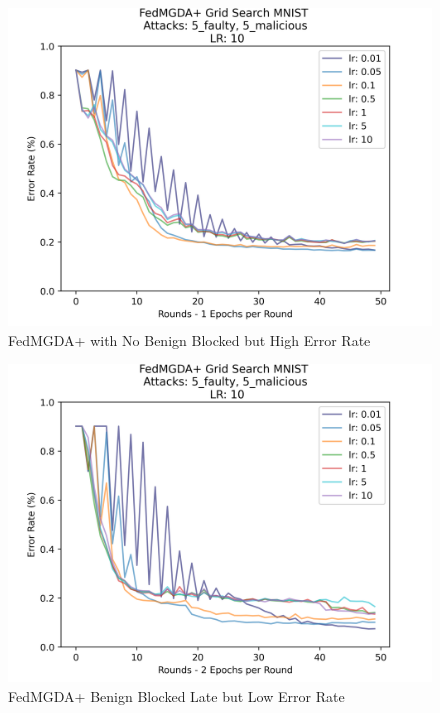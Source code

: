 \begin{figure}[htbp]
	\centering
    \includegraphics[scale=0.5]{initial/graphs/1epoch_grid.png}
	\caption{FedMGDA+ with No Benign Blocked but High Error Rate}
	\label{fig:1epoch_grid}
\end{figure}

\begin{figure}[htbp]
	\centering
    \includegraphics[scale=0.5]{initial/graphs/2epoch_grid.png}
	\caption{FedMGDA+ Benign Blocked Late but Low Error Rate}
	\label{fig:2epoch_grid}
\end{figure}


